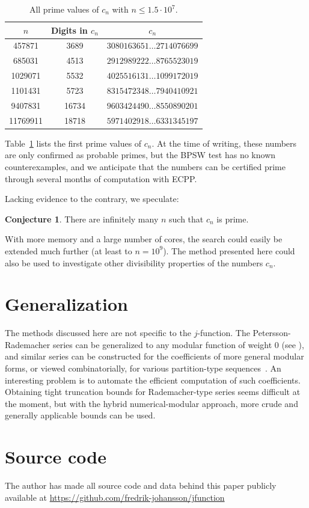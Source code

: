 \documentclass{amsart}
\theoremstyle{definition}
\newtheorem{conjecture}[theorem]{Conjecture}
\theoremstyle{remark}
\begin{document}
\begin{table}
\begin{center}
\caption{All prime values of $c_n$ with $n \le 1.5 \cdot 10^7$.}
\label{tab:primes}
\renewcommand{\baselinestretch}{1.25}
\begin{small}
\begin{tabular}{ c | c | c } 
$n$  & Digits in $c_n$ & $c_n$ \\ \hline
457871 & 3689 & $3080163651 \ldots 2714076699$ \\
685031 & 4513 & $2912989222 \ldots 8765523019$ \\
1029071 & 5532 & $4025516131 \ldots 1099172019$ \\
1101431 & 5723 & $8315472348 \ldots 7940410921$ \\
9407831 & 16734 & $9603424490 \ldots 8550890201$ \\
11769911 & 18718 & $5971402918 \ldots 6331345197$ \\
\end{tabular}
\end{small}
\end{center}
\end{table}

Table~\ref{tab:primes} lists the first prime values of $c_n$.
At the time of writing, these numbers are only confirmed as probable primes,
but the BPSW test has no known counterexamples,
and we anticipate that the numbers can be certified
prime through several months of computation with ECPP.

Lacking evidence to the contrary, we speculate:

\begin{conjecture}
There are infinitely many $n$ such that $c_n$ is prime.
\end{conjecture}

With more memory and a large number of cores, the search could easily be extended
much further (at least to $n = 10^9$). The method presented here could also be used
to investigate other divisibility properties of the numbers $c_n$.

\section{Generalization}

The methods discussed here are not specific to the $j$-function.
The Petersson-Rademacher series can be generalized to
any modular function of weight 0 (see \cite[Theorem~5.1]{Brisebarre2005}),
and similar series can be constructed
for the coefficients of more general modular forms,
or viewed combinatorially,
for various partition-type sequences~\cite{sills2010towards}.
An interesting problem is to automate the efficient
computation of such coefficients.
Obtaining tight truncation bounds for Rademacher-type series
seems difficult at the moment,
but with the hybrid
numerical-modular approach, more crude and generally
applicable bounds can be used.

\section{Source code}

The author has made all source code and data behind this
paper publicly available at \url{https://github.com/fredrik-johansson/jfunction}



\end{document}
